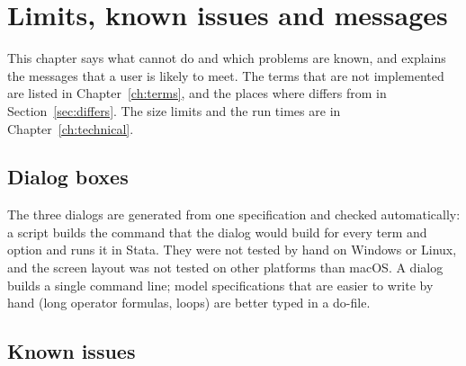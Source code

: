 \chapter{Limits, known issues and messages}\label{ch:limits}

This chapter says what \nwergm{} cannot do and which problems are known, and explains the messages that a user is likely to meet. The terms that are not implemented are listed in Chapter~\ref{ch:terms}, and the places where \nwergm{} differs from \ergm{} in Section~\ref{sec:differs}. The size limits and the run times are in Chapter~\ref{ch:technical}.

\section{Dialog boxes}

The three dialogs are generated from one specification and checked automatically: a script builds the command that the dialog would build for every term and option and runs it in Stata. They were not tested by hand on Windows or Linux, and the screen layout was not tested on other platforms than macOS. A dialog builds a single command line; model specifications that are easier to write by hand (long operator formulas,  loops) are better typed in a do-file.

\section{Known issues}\label{sec:issues}

